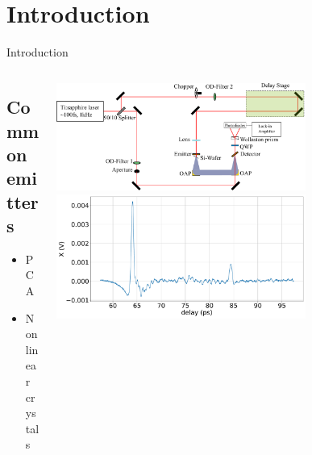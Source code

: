 \documentclass[aspectratio=1610, 9pt]{beamer}
\begin{document}
\section{Introduction}
\begin{frame}{Introduction}
\begin{columns}
  \begin{column}{.3\textwidth}
    \subsection{Common emitters}
    \begin{itemize}
      \item PCA 
      \vspace{0.3in}
      \item{Non linear crystals}
    \end{itemize}
  \end{column}
  \begin{column}{.7\textwidth}
    \includegraphics[width=0.7\textwidth]{images/Aufbau.pdf}
  \vspace{0.3in}
    \includegraphics[width=0.7\textwidth]{images/2_11_30_20normalX.pdf}
  \end{column}
\end{columns}
\end{frame}
\end{document}
